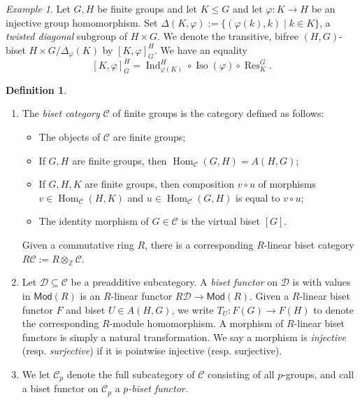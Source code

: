 \documentclass[]{amsart}
\newcommand{\Hom}{\operatorname{Hom}}
\newcommand{\Res}{\operatorname{Res}}
\newcommand{\Ind}{\operatorname{Ind}}
\newcommand{\Iso}{\operatorname{Iso}}
\newcommand{\calC}{\mathcal{C}}
\newcommand{\calD}{\mathcal{D}}
\newcommand{\bbZ}{\mathbb{Z}}
\theoremstyle{remark}
\newtheorem{example}[theorem]{Example}
\theoremstyle{definition}
\newtheorem{definition}[theorem]{Definition}
\begin{document}
	\begin{example}\label{ex:twisted_diag}
		Let $G,H$ be finite groups and let $K \leq G$ and let $\varphi\colon K \to H$ be an injective group homomorphism. Set $\Delta(K, \varphi) := \{(\varphi(k),k) \mid k \in K\}$, a \emph{twisted diagonal} subgroup of $H \times G$. We denote the transitive, bifree $(H,G)$-biset $H \times G/\Delta_\varphi(K)$ by $[K,\varphi]^H_G$. We have an equality \[[K,\varphi]^H_G = \Ind^H_{\varphi(K)}\circ \Iso(\varphi) \circ \Res^G_K.\]
	\end{example}
	
	\begin{definition}
		\begin{enumerate}
			\item The \emph{biset category} $\calC$ of finite groups is the category defined as follows:
			\begin{itemize}
				\item The objects of $\calC$ are finite groups;
				\item If $G,H$ are finite groups, then $\Hom_\calC(G,H) = A(H,G)$;
				\item If $G,H,K$ are finite groups, then composition $v\circ u$ of morphisms $v \in \Hom_\calC(H,K)$ and $u\in \Hom_\calC(G,H)$ is equal to $v \circ u$;
				\item The identity morphism of $G \in \calC$ is the virtual biset $[G]$.
			\end{itemize}
			Given a commutative ring $R$, there is a corresponding $R$-linear biset category $R\calC := R \otimes_\bbZ \calC$. 
			\item Let $\calD \subseteq \calC$ be a preadditive subcategory. A \emph{biset functor} on $\calD$ is with values in $\mathsf{Mod}(R)$ is an $R$-linear functor $R\calD \to \mathsf{Mod}(R)$. Given a $R$-linear biset functor $F$ and biset $U\in A(H,G)$, we write $T_U\colon F(G) \to F(H)$ to denote the corresponding $R$-module homomorphism. A morphism of $R$-linear biset functors is simply a natural transformation. We say a morphism is \emph{injective} (resp. \emph{surjective}) if it is pointwise injective (resp. surjective). 
			
			\item We let $\calC_p$ denote the full subcategory of $\calC$ consisting of all $p$-groups, and call a biset functor on $\calC_p$ a \emph{$p$-biset functor.} 
			
		\end{enumerate}
	\end{definition}
	
\end{document}
